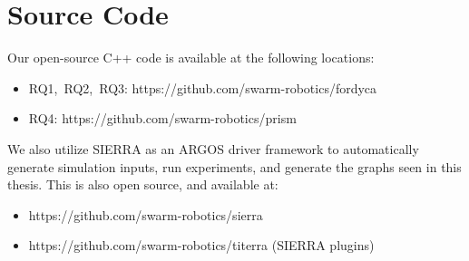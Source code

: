 \section{Source Code}\label{sec:exp-source-code}

Our open-source C++ code is available at the following locations:
%
\begin{itemize}
\item {\gls{RQ1},~\gls{RQ2},~\gls{RQ3}:
    https://github.com/swarm-robotics/fordyca }
\item {\gls{RQ4}: https://github.com/swarm-robotics/prism}
\end{itemize}
%
We also utilize SIERRA as an ARGOS driver framework to automatically generate
simulation inputs, run experiments, and generate the graphs seen in this thesis.
This is also open source, and available at:
%
\begin{itemize}
  \item {https://github.com/swarm-robotics/sierra}
  \item {https://github.com/swarm-robotics/titerra (SIERRA plugins)}
\end{itemize}

